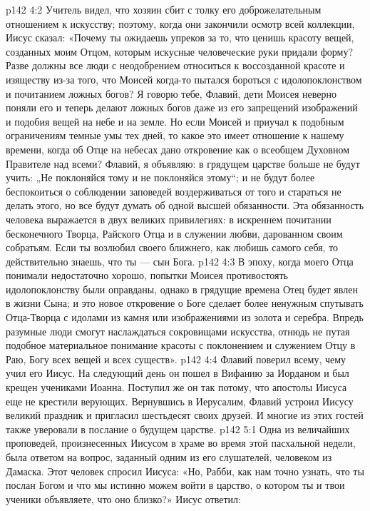 \vs p142 4:2 Учитель видел, что хозяин сбит с толку его доброжелательным отношением к искусству; поэтому, когда они закончили осмотр всей коллекции, Иисус сказал: «Почему ты ожидаешь упреков за то, что ценишь красоту вещей, созданных моим Отцом, которым искусные человеческие руки придали форму? Разве должны все люди с неодобрением относиться к воссозданной красоте и изяществу из\hyp{}за того, что Моисей когда\hyp{}то пытался бороться с идолопоклонством и почитанием ложных богов? Я говорю тебе, Флавий, дети Моисея неверно поняли его и теперь делают ложных богов даже из его запрещений изображений и подобия вещей на небе и на земле. Но если Моисей и приучал к подобным ограничениям темные умы тех дней, то какое это имеет отношение к нашему времени, когда об Отце на небесах дано откровение как о всеобщем Духовном Правителе над всеми? Флавий, я объявляю: в грядущем царстве больше не будут учить: „Не поклоняйся тому и не поклоняйся этому“; и не будут более беспокоиться о соблюдении заповедей воздерживаться от того и стараться не делать этого, но все будут думать об одной высшей обязанности. Эта обязанность человека выражается в двух великих привилегиях: в искреннем почитании бесконечного Творца, Райского Отца и в служении любви, дарованном своим собратьям. Если ты возлюбил своего ближнего, как любишь самого себя, то действительно знаешь, что ты --- сын Бога.
\vs p142 4:3 В эпоху, когда моего Отца понимали недостаточно хорошо, попытки Моисея противостоять идолопоклонству были оправданы, однако в грядущие времена Отец будет явлен в жизни Сына; и это новое откровение о Боге сделает более ненужным спутывать Отца\hyp{}Творца с идолами из камня или изображениями из золота и серебра. Впредь разумные люди смогут наслаждаться сокровищами искусства, отнюдь не путая подобное материальное понимание красоты с поклонением и служением Отцу в Раю, Богу всех вещей и всех существ».
\vs p142 4:4 \pc Флавий поверил всему, чему учил его Иисус. На следующий день он пошел в Вифанию за Иорданом и был крещен учениками Иоанна. Поступил же он так потому, что апостолы Иисуса еще не крестили верующих. Вернувшись в Иерусалим, Флавий устроил Иисусу великий праздник и пригласил шестьдесят своих друзей. И многие из этих гостей также уверовали в послание о будущем царстве.
\vs p142 5:1 Одна из величайших проповедей, произнесенных Иисусом в храме во время этой пасхальной недели, была ответом на вопрос, заданный одним из его слушателей, человеком из Дамаска. Этот человек спросил Иисуса: «Но, Рабби, как нам точно узнать, что ты послан Богом и что мы истинно можем войти в царство, о котором ты и твои ученики объявляете, что оно близко?» Иисус ответил:
